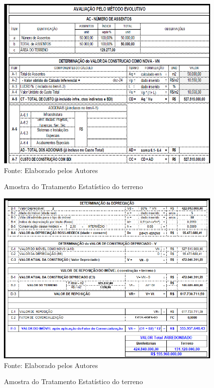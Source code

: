 \begin{figure}[H]
	\centering  \small 		\caption{ Amostra do Tratamento Estatístico do terreno}
	\includegraphics[width=0.94947\linewidth]{figura/screenshot039}
	\label{fig:screenshot039}\\{ Fonte: Elaborado pelos Autores }
\end{figure}

\begin{figure}[H]
	\centering  \small 		\caption{ Amostra do Tratamento Estatístico do terreno}
	\includegraphics[width=0.94947\linewidth]{figura/screenshot040}
	\label{fig:screenshot040}\\{ Fonte: Elaborado pelos Autores }
\end{figure}

